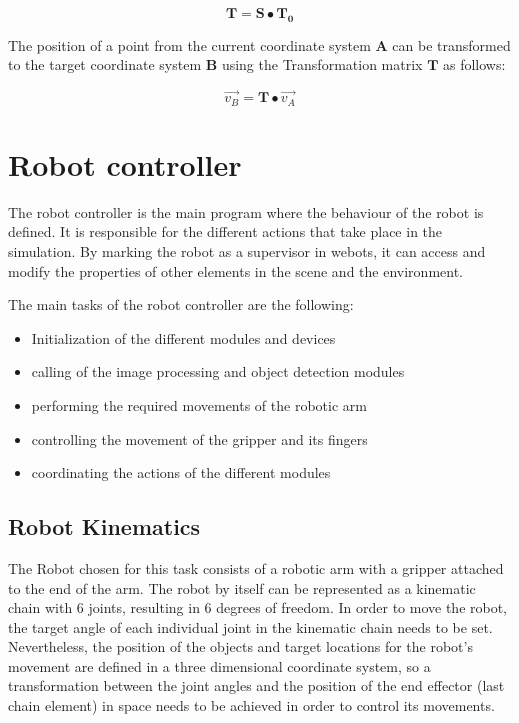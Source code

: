 $$\mathbf{T} =  \mathbf{S} \bullet  \mathbf{T_{0}}$$

The position of a point from the current coordinate system $\mathbf{A}$ can be transformed to the target coordinate system $\mathbf{B}$ using the Transformation matrix $\mathbf{T}$ as follows:

$$\vec{v_{B}} = \mathbf{T} \bullet \vec{v_{A}}$$

\section{Robot controller}

The robot controller is the main program where the behaviour of the robot is defined. It is responsible for the different actions that take place in the simulation. By marking the robot as a supervisor in webots, it can access and modify the properties of other elements in the scene and the environment. 

The main tasks of the robot controller are the following:

\begin{itemize}
    \item Initialization of the different modules and devices
    \item calling of the image processing and object detection modules
    \item performing the required movements of the robotic arm
    \item controlling the movement of the gripper and its fingers
    \item coordinating the actions of the different modules
\end{itemize}

\subsection{Robot Kinematics}

The Robot chosen for this task consists of a robotic arm with a gripper attached to the end of the arm. The robot by itself can be represented as a kinematic chain with 6 joints, resulting in 6 degrees of freedom.
In order to move the robot, the target angle of each individual joint in the kinematic chain needs to be set. Nevertheless, the position of the objects and target locations for the robot's movement are defined in a three dimensional coordinate system, so a transformation between the joint angles and the position of the end effector (last chain element) in space needs to be achieved in order to control its movements.

